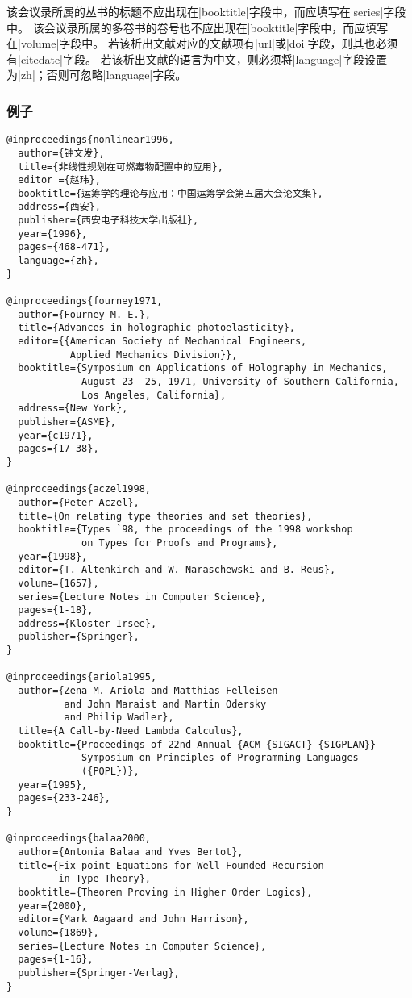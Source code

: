 \begin{note}
该会议录所属的丛书的标题不应出现在|booktitle|字段中，而应填写在|series|字段中。
该会议录所属的多卷书的卷号也不应出现在|booktitle|字段中，而应填写在|volume|字段中。
若该析出文献对应的文献项有|url|或|doi|字段，则其也必须有|citedate|字段。
若该析出文献的语言为中文，则必须将|language|字段设置为|zh|；否则可忽略|language|字段。
\end{note}

\subsubsection{例子}

\begin{verbatim}
@inproceedings{nonlinear1996,
  author={钟文发},
  title={非线性规划在可燃毒物配置中的应用},
  editor ={赵玮},
  booktitle={运筹学的理论与应用：中国运筹学会第五届大会论文集},
  address={西安},
  publisher={西安电子科技大学出版社},
  year={1996},
  pages={468-471},
  language={zh},
}

@inproceedings{fourney1971,
  author={Fourney M. E.},
  title={Advances in holographic photoelasticity},
  editor={{American Society of Mechanical Engineers, 
           Applied Mechanics Division}},
  booktitle={Symposium on Applications of Holography in Mechanics, 
             August 23--25, 1971, University of Southern California, 
             Los Angeles, California},
  address={New York},
  publisher={ASME},
  year={c1971},
  pages={17-38},
}

@inproceedings{aczel1998,
  author={Peter Aczel},
  title={On relating type theories and set theories},
  booktitle={Types `98, the proceedings of the 1998 workshop 
             on Types for Proofs and Programs},
  year={1998},
  editor={T. Altenkirch and W. Naraschewski and B. Reus},
  volume={1657},
  series={Lecture Notes in Computer Science},
  pages={1-18},
  address={Kloster Irsee},
  publisher={Springer},
}

@inproceedings{ariola1995,
  author={Zena M. Ariola and Matthias Felleisen 
          and John Maraist and Martin Odersky 
          and Philip Wadler},
  title={A Call-by-Need Lambda Calculus},
  booktitle={Proceedings of 22nd Annual {ACM {SIGACT}-{SIGPLAN}} 
             Symposium on Principles of Programming Languages
             ({POPL})},
  year={1995},
  pages={233-246},
}

@inproceedings{balaa2000,
  author={Antonia Balaa and Yves Bertot},
  title={Fix-point Equations for Well-Founded Recursion 
         in Type Theory},
  booktitle={Theorem Proving in Higher Order Logics},
  year={2000},
  editor={Mark Aagaard and John Harrison},
  volume={1869},
  series={Lecture Notes in Computer Science},
  pages={1-16},
  publisher={Springer-Verlag},
}


\end{verbatim}
